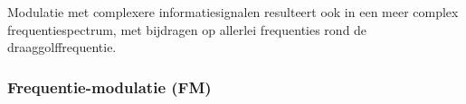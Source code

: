 
Modulatie met complexere informatiesignalen resulteert ook in een meer complex frequentiespectrum, met bijdragen op allerlei frequenties rond de draaggolffrequentie.

\subsubsection{Frequentie-modulatie (FM)}

